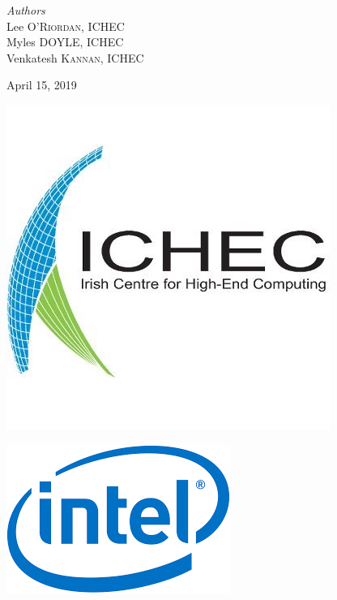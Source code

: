 \documentclass[11pt]{article}
\begin{document}
\begin{titlepage}
\vfill
\begin{center} \large
\emph{Authors}\\[0.5cm]
Lee \textsc{O'Riordan}, ICHEC\\[0.2cm]
Myles \textsc{DOYLE}, ICHEC\\[0.2cm]
Venkatesh \textsc{Kannan}, ICHEC
\end{center}
\vfill
{\large April 15, 2019}\\[1cm] 
\vfill
\hfill\begin{minipage}{0.4\textwidth}
\includegraphics[scale=0.3]{ichec_logo.jpeg}
\end{minipage}
\hfill
\begin{minipage}{0.4\textwidth}
\includegraphics[scale=0.4]{intel_logo.png}
\end{minipage}
\hfill
\vfill
\end{titlepage}

\end{document}
